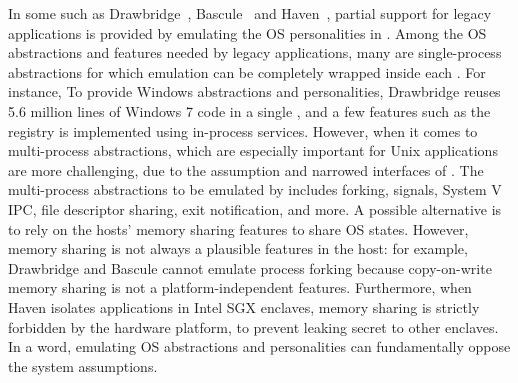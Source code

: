

In some \liboses{} such as Drawbridge~\citep{porter11drawbridge}, Bascule~\citep{baumann13bascule} and Haven~\citep{baumann14haven},
partial support for legacy applications is provided
by emulating the OS personalities in \picoprocs{}.
Among the OS abstractions and features needed by legacy applications,
many are single-process abstractions
for which emulation can be completely wrapped inside each \picoprocs{}. %
For instance, %
To provide Windows abstractions and personalities,
Drawbridge reuses 5.6 million lines of Windows 7 code in a single \picoproc{},
and a few features such as the registry is implemented
using in-process services. %
However, when it comes to multi-process abstractions,
which are especially important for Unix applications
are more challenging, %
due to the assumption and
narrowed interfaces of \picoprocs{}.
The multi-process abstractions to be emulated by \libos{} includes
forking, signals, System V IPC, file descriptor sharing, exit notification, and more.
A possible alternative is
to rely on %
the hosts' memory sharing features to share OS states.
However, memory sharing is not always a plausible features in the host:
for example, Drawbridge and Bascule cannot emulate process forking because copy-on-write memory sharing is not a platform-independent features.
Furthermore, when Haven isolates applications
in Intel SGX enclaves,
memory sharing is strictly forbidden by the hardware platform,
to prevent leaking secret to other enclaves.
In a word, emulating OS abstractions and personalities can fundamentally
oppose the system assumptions. %


